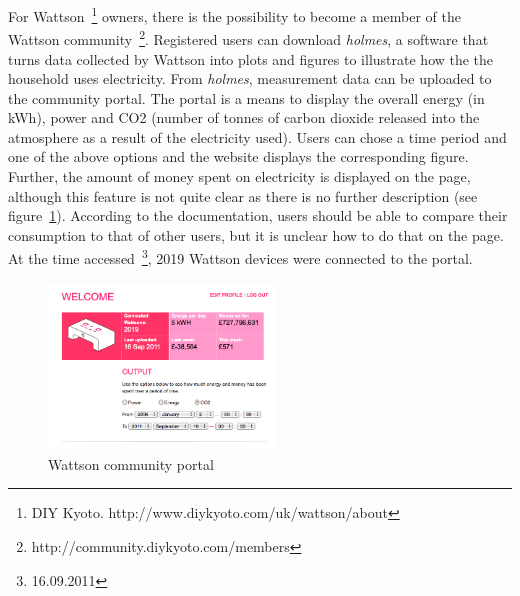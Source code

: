 For Wattson~\footnote{DIY Kyoto. http://www.diykyoto.com/uk/wattson/about} owners, there is the possibility to become a member of the Wattson community~\footnote{http://community.diykyoto.com/members}. Registered users can download \textit{holmes}, a software that turns data collected by Wattson into plots and figures to illustrate how the the household uses electricity. From \textit{holmes}, measurement data can be uploaded to the community portal. The portal is a means to display the overall energy (in kWh), power and CO2 (number of tonnes of carbon dioxide released into the atmosphere as a result of the electricity used). Users can chose a time period and one of the above options and the website displays the corresponding figure. Further, the amount of money spent on electricity is displayed on the page, although this feature is not quite clear as there is no further description (see figure~\ref{wattson_community}). According to the documentation, users should be able to compare their consumption to that of other users, but it is unclear how to do that on the page. At the time accessed~\footnote{16.09.2011}, 2019 Wattson devices were connected to the portal. 
\begin{figure}[htbp]
\begin{center}
\includegraphics[width=6cm]{Images/wattson_community.png}
\caption{Wattson community portal}
\label{wattson_community}
\end{center}
\end{figure}

